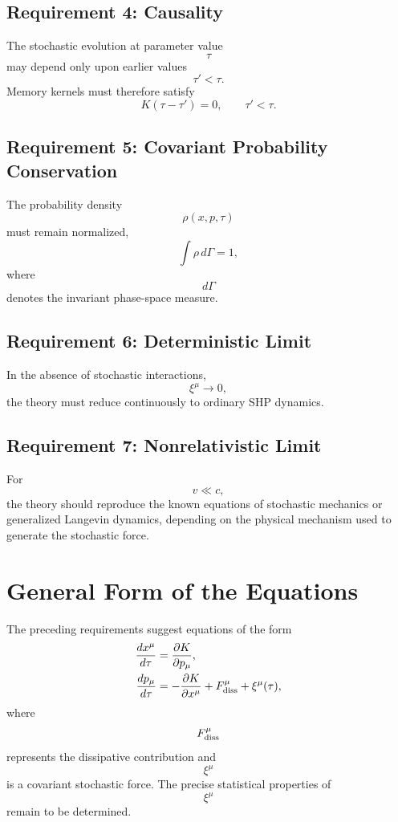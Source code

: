 \subsection*{Requirement 4: Causality}
The stochastic evolution at parameter value
\[\tau\]
may depend only upon earlier values
\[\tau'<\tau.\]
Memory kernels must therefore satisfy
\[K(\tau-\tau')=0,\qquad\tau'<\tau.\]
\subsection*{Requirement 5: Covariant Probability Conservation}
The probability density
\[\rho(x,p,\tau)\]
must remain normalized,
\[\int\rho\,d\Gamma=1,\]
where
\[d\Gamma\]
denotes the invariant phase-space measure.
\subsection*{Requirement 6: Deterministic Limit}
In the absence of stochastic interactions,
\[\xi^\mu\rightarrow0,\]
the theory must reduce continuously to ordinary SHP dynamics.
\subsection*{Requirement 7: Nonrelativistic Limit}
For
\[v\ll c,\]
the theory should reproduce the known equations of stochastic mechanics
or generalized Langevin dynamics, depending on the physical mechanism
used to generate the stochastic force.
\section{General Form of the Equations}
The preceding requirements suggest equations of the form
\begin{align}
\frac{dx^\mu}{d\tau}&=\frac{\partial K}{\partial p_\mu},\\
\frac{dp_\mu}{d\tau}&=-\frac{\partial K}{\partial x^\mu}
    +F^\mu_{\rm diss}+\xi^\mu(\tau),
\end{align}
where
\[F^\mu_{\rm diss}\]
represents the dissipative contribution and
\[\xi^\mu\]
is a covariant stochastic force.
The precise statistical properties of
\[\xi^\mu\]
remain to be determined.

